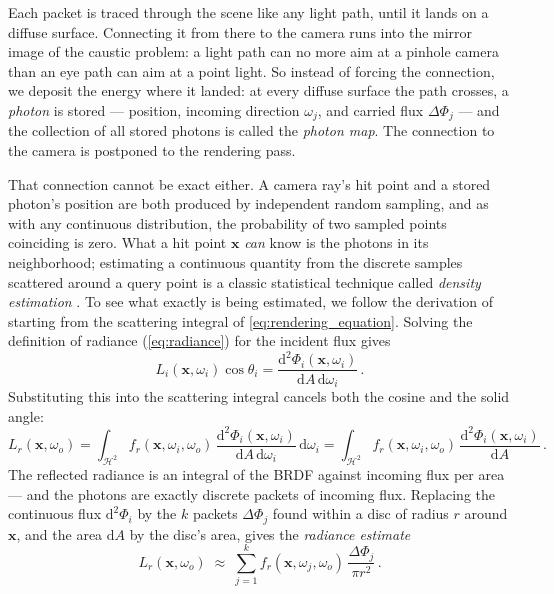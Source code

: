 Each packet is traced through the scene like any light path, until it lands on a diffuse surface. Connecting it from there to the camera runs into the mirror image of the caustic problem: a light path can no more aim at a pinhole camera than an eye path can aim at a point light. So instead of forcing the connection, we deposit the energy where it landed: at every diffuse surface the path crosses, a \emph{photon} is stored --- position, incoming direction $\omega_j$, and carried flux $\Delta\Phi_j$ --- and the collection of all stored photons is called the \emph{photon map}. The connection to the camera is postponed to the rendering pass.

That connection cannot be exact either. A camera ray's hit point and a stored photon's position are both produced by independent random sampling, and as with any continuous distribution, the probability of two sampled points coinciding is zero. What a hit point $\mathbf{x}$ \emph{can} know is the photons in its neighborhood; estimating a continuous quantity from the discrete samples scattered around a query point is a classic statistical technique called \emph{density estimation} \cite{silverman86}. To see what exactly is being estimated, we follow the derivation of \cite{jensen96} starting from the scattering integral of \cref{eq:rendering_equation}. Solving the definition of radiance (\cref{eq:radiance}) for the incident flux gives
\begin{equation*}
	L_i(\mathbf{x}, \omega_i) \cos\theta_i = \frac{\mathrm{d}^2\Phi_i(\mathbf{x}, \omega_i)}{\mathrm{d}A \,\mathrm{d}\omega_i} \,.
\end{equation*}
Substituting this into the scattering integral cancels both the cosine and the solid angle:
\begin{equation}
	\label{eq:gather_integral}
	L_r(\mathbf{x}, \omega_o)
	= \int_{\mathcal{H}^2} f_r(\mathbf{x}, \omega_i, \omega_o) \, \frac{\mathrm{d}^2\Phi_i(\mathbf{x}, \omega_i)}{\mathrm{d}A \,\mathrm{d}\omega_i} \,\mathrm{d}\omega_i
	= \int_{\mathcal{H}^2} f_r(\mathbf{x}, \omega_i, \omega_o) \, \frac{\mathrm{d}^2\Phi_i(\mathbf{x}, \omega_i)}{\mathrm{d}A} \,.
\end{equation}
The reflected radiance is an integral of the BRDF against incoming flux per area --- and the photons are exactly discrete packets of incoming flux. Replacing the continuous flux $\mathrm{d}^2\Phi_i$ by the $k$ packets $\Delta\Phi_j$ found within a disc of radius $r$ around $\mathbf{x}$, and the area $\mathrm{d}A$ by the disc's area, gives the \emph{radiance estimate}
\begin{equation}
	\label{eq:photon_gather}
	L_r(\mathbf{x}, \omega_o) \;\approx\; \sum_{j=1}^{k} f_r(\mathbf{x}, \omega_j, \omega_o) \, \frac{\Delta\Phi_j}{\pi r^2} \,.
\end{equation}
